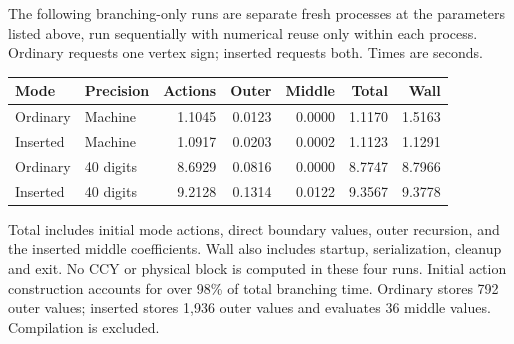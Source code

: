 The following branching-only runs are separate fresh processes at the parameters
listed above, run sequentially with numerical reuse only within each process.
Ordinary requests one vertex sign; inserted requests both. Times are seconds.
\begin{center}\small
\begin{tabular}{@{}llrrrrr@{}}
\toprule
Mode & Precision & Actions & Outer & Middle & Total & Wall \\
\midrule
Ordinary & Machine & 1.1045 & 0.0123 & 0.0000 & 1.1170 & 1.5163 \\
Inserted & Machine & 1.0917 & 0.0203 & 0.0002 & 1.1123 & 1.1291 \\
Ordinary & 40 digits & 8.6929 & 0.0816 & 0.0000 & 8.7747 & 8.7966 \\
Inserted & 40 digits & 9.2128 & 0.1314 & 0.0122 & 9.3567 & 9.3778 \\
\bottomrule
\end{tabular}
\end{center}
Total includes initial mode actions, direct boundary values, outer recursion,
and the inserted middle coefficients. Wall also includes startup, serialization,
cleanup and exit. No CCY or physical block is computed in these four runs.
Initial action construction accounts for over 98\% of total branching time.
Ordinary stores 792 outer values; inserted stores 1,936 outer values and evaluates
36 middle values. Compilation is excluded.
